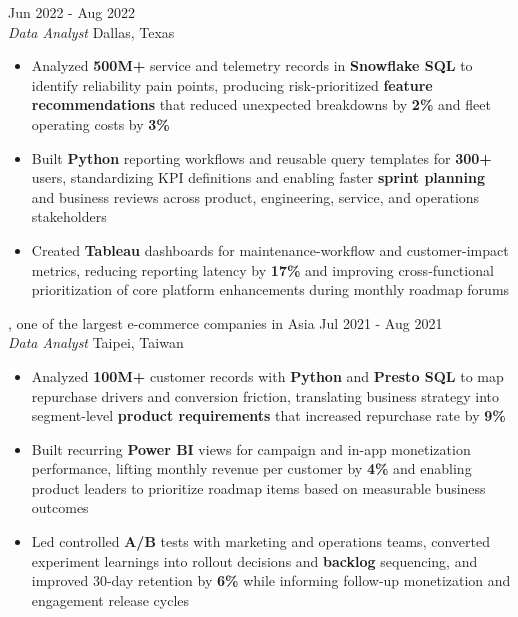 \documentclass[11pt,letterpaper]{article}
\begin{document}
\vspace{4pt}
 \hfill Jun 2022 - Aug 2022\\[-1pt]
\textit{Data Analyst} \hfill Dallas, Texas
\begin{itemize}[leftmargin=1.5em, rightmargin=0pt, itemsep=-1pt, topsep=-1pt, parsep=0pt]
  \item \justifying Analyzed \textbf{500M+} service and telemetry records in \textbf{Snowflake SQL} to identify reliability pain points, producing risk-prioritized \textbf{feature recommendations} that reduced unexpected breakdowns by \textbf{2\%} and fleet operating costs by \textbf{3\%}
  \item \justifying Built \textbf{Python} reporting workflows and reusable query templates for \textbf{300+} users, standardizing KPI definitions and enabling faster \textbf{sprint planning} and business reviews across product, engineering, service, and operations stakeholders
  \item \justifying Created \textbf{Tableau} dashboards for maintenance-workflow and customer-impact metrics, reducing reporting latency by \textbf{17\%} and improving cross-functional prioritization of core platform enhancements during monthly roadmap forums
\end{itemize}

\vspace{4pt}
, one of the largest e-commerce companies in Asia \hfill Jul 2021 - Aug 2021\\[-1pt]
\textit{Data Analyst} \hfill Taipei, Taiwan
\begin{itemize}[leftmargin=1.5em, rightmargin=0pt, itemsep=-1pt, topsep=-1pt, parsep=0pt]
  \item \justifying Analyzed \textbf{100M+} customer records with \textbf{Python} and \textbf{Presto SQL} to map repurchase drivers and conversion friction, translating business strategy into segment-level \textbf{product requirements} that increased repurchase rate by \textbf{9\%}
  \item \justifying Built recurring \textbf{Power BI} views for campaign and in-app monetization performance, lifting monthly revenue per customer by \textbf{4\%} and enabling product leaders to prioritize roadmap items based on measurable business outcomes
  \item \justifying Led controlled \textbf{A/B} tests with marketing and operations teams, converted experiment learnings into rollout decisions and \textbf{backlog} sequencing, and improved 30-day retention by \textbf{6\%} while informing follow-up monetization and engagement release cycles
\end{itemize}
\end{document}
